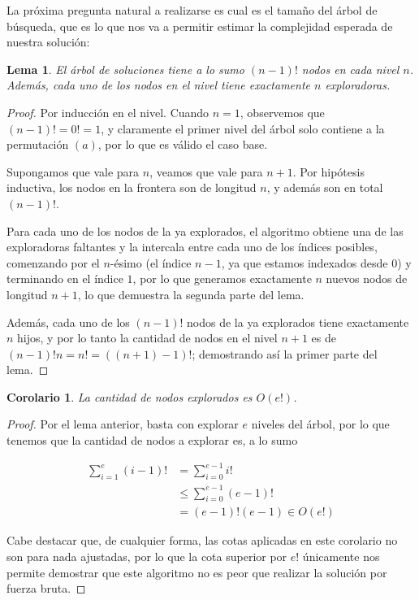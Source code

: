 \documentclass{article}
\newtheorem{corollary}{Corolario}[theorem]
\newtheorem{lemma}{Lema}[theorem]
\theoremstyle{definition}
\theoremstyle{remark}
\begin{document}
La próxima pregunta natural a realizarse es cual es el tamaño del árbol de búsqueda, que es lo que nos va a permitir estimar la complejidad esperada de nuestra solución:

\begin{lemma}
El árbol de soluciones tiene a lo sumo $(n-1)!$ nodos en cada nivel $n$. Además, cada uno de los nodos en el nivel tiene exactamente $n$ exploradoras.
\end{lemma}

\begin{proof}
Por inducción en el nivel. Cuando $n = 1$, observemos que $(n-1)! = 0! = 1$, y claramente el primer nivel del árbol solo contiene a la permutación $(a)$, por lo que es válido el caso base.

Supongamos que vale para $n$, veamos que vale para $n+1$. Por hipótesis inductiva, los nodos en la frontera son de longitud $n$, y además son en total $(n-1)!$.

Para cada uno de los nodos de la ya explorados, el algoritmo obtiene una de las exploradoras faltantes y la intercala entre cada uno de los índices posibles, comenzando por el $n$-ésimo (el índice $n-1$, ya que estamos indexados desde $0$) y terminando en el índice $1$, por lo que generamos exactamente $n$ nuevos nodos de longitud $n+1$, lo que demuestra la segunda parte del lema.

Además, cada uno de los $(n-1)!$ nodos de la ya explorados tiene exactamente $n$ hijos, y por lo tanto la cantidad de nodos en el nivel $n+1$ es de $(n-1)! n = n! = ((n + 1) - 1)!$; demostrando así la primer parte del lema.
\end{proof}

\begin{corollary}
La cantidad de nodos explorados es $O(e!)$.
\end{corollary}

\begin{proof}
Por el lema anterior, basta con explorar $e$ niveles del árbol, por lo que tenemos que la cantidad de nodos a explorar es, a lo sumo

\begin{equation}
\begin{aligned}
\sum_{i=1}^{e} (i-1)! &= \sum_{i=0}^{e-1} i! \\
&\leq \sum_{i=0}^{e-1} (e-1)! \\
&= (e-1)! (e-1) \in O(e!)
\end{aligned}
\end{equation}

Cabe destacar que, de cualquier forma, las cotas aplicadas en este corolario no son para nada ajustadas, por lo que la cota superior por $e!$ únicamente nos permite demostrar que este algoritmo no es peor que realizar la solución por fuerza bruta.
\end{proof}
\end{document}
